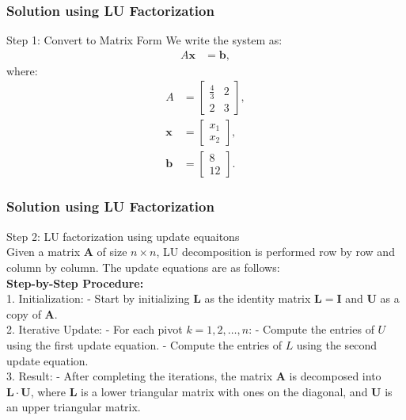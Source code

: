 \documentclass{beamer}
\theoremstyle{remark}
\numberwithin{equation}{section}
\begin{document}
\begin{frame}
\frametitle{Solution using LU Factorization}

Step 1: Convert to Matrix Form
	We write the system as:
	\begin{align}
		A \mathbf{x} &= \mathbf{b},
	\end{align}
	where:
	\begin{align}
		A &= \begin{bmatrix} \frac{4}{3} & 2 \\ 2 & 3 \end{bmatrix}, \\
		\mathbf{x} &= \begin{bmatrix} x_1 \\ x_2 \end{bmatrix}, \\
		\mathbf{b} &= \begin{bmatrix} 8 \\ 12 \end{bmatrix}.
	\end{align}
\end{frame}


\begin{frame}
\frametitle{Solution using LU Factorization}

Step 2: LU factorization using update equaitons\\
	Given a matrix $ \mathbf{A} $ of size $ n \times n $, LU decomposition is performed row by row and column by column. The update equations are as follows:\\
    
	\textbf{Step-by-Step Procedure:}\\
	1. Initialization: 
	- Start by initializing $ \mathbf{L} $ as the identity matrix $ \mathbf{L} = \mathbf{I} $ and $ \mathbf{U} $ as a copy of $ \mathbf{A} $.\\
	
	2. Iterative Update:
	- For each pivot $ k = 1, 2, \ldots, n $:
	- Compute the entries of $ U $ using the first update equation.
	- Compute the entries of $ L $ using the second update equation.\\
	3. Result:
	- After completing the iterations, the matrix $ \mathbf{A} $ is decomposed into $ \mathbf{L} \cdot \mathbf{U} $, where $ \mathbf{L} $ is a lower triangular matrix with ones on the diagonal, and $ \mathbf{U} $ is an upper triangular matrix.\\
\end{frame}
\end{document}
